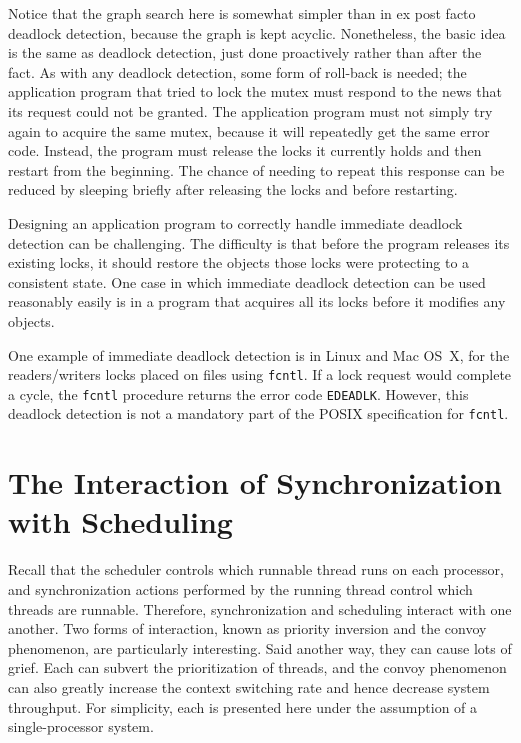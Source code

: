 Notice that the graph search here is somewhat simpler than in
ex post facto deadlock detection, because the graph is kept acyclic.
Nonetheless, the basic idea is the same as deadlock detection, just
done proactively rather than after the fact.  As with any deadlock
detection, some form of roll-back is needed; the application program
that tried to lock the mutex must respond to the news that its request
could not be granted.  The application program must not simply try
again to acquire the same mutex, because it will repeatedly get the
same error code.  Instead, the program must release the locks it
currently holds and then restart from the beginning.  The chance of
needing to repeat this response can be reduced by sleeping briefly
after releasing the locks and before restarting.

Designing an application program to correctly handle immediate
deadlock detection can be challenging.  The difficulty is that before
the program releases its existing locks, it should restore the objects
those locks were protecting to a consistent state.  One case in which
immediate deadlock detection can be used reasonably easily is in a
program that acquires all its locks before it modifies any objects.

One example of immediate deadlock detection is in
Linux and Mac OS~X, for the readers/writers locks placed on files using
\verb|fcntl|.  If a lock request would complete a cycle, the
\verb|fcntl| procedure returns the error code \verb|EDEADLK|.  However, this
deadlock detection is not a mandatory part of the POSIX specification
for \verb|fcntl|.

\section[Synchronization/Scheduling Interactions]{The Interaction of Synchronization with Scheduling}\label{synchronization-and-scheduling-section}

Recall that the scheduler controls which runnable thread runs on each processor, and
synchronization actions performed by the running thread control which
threads are runnable.  Therefore, synchronization and scheduling interact with one another.
Two forms of interaction, known as priority inversion and the convoy
phenomenon, are particularly interesting.  Said another way, they can
cause lots of grief.  Each can subvert the prioritization of threads,
and the convoy phenomenon can also greatly increase the context
switching rate and hence decrease system throughput.
For simplicity, each is presented here under the assumption of a single-processor system.

